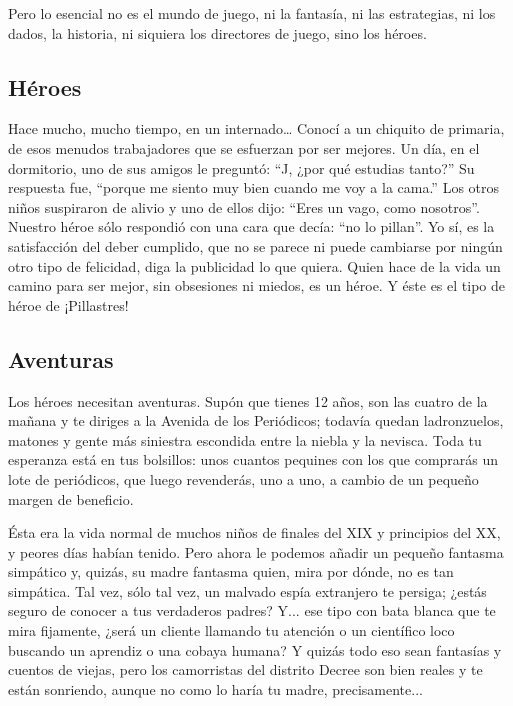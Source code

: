 Pero lo esencial no es el mundo de juego, ni la fantasía, ni las estrategias, ni los dados, la historia, ni siquiera los directores de juego, sino los héroes.

\subsection{Héroes}

Hace mucho, mucho tiempo, en un internado… Conocí a un chiquito de primaria, de esos menudos trabajadores que se esfuerzan por ser mejores. Un día, en el dormitorio, uno de sus amigos le preguntó: “J, ¿por qué estudias tanto?” Su respuesta fue, “porque me siento muy bien cuando me voy a la cama.” Los otros niños suspiraron de alivio y uno de ellos dijo: “Eres un vago, como nosotros”. Nuestro héroe sólo respondió con una cara que decía: “no lo pillan”. Yo sí, es la satisfacción del deber cumplido, que no se parece ni puede cambiarse por ningún otro tipo de felicidad, diga la publicidad lo que quiera. Quien hace de la vida un camino para ser mejor, sin obsesiones ni miedos, es un héroe. Y éste es el tipo de héroe de ¡Pillastres!

\subsection{Aventuras}

Los héroes necesitan aventuras. Supón que tienes 12 años, son las cuatro de la mañana y te diriges a la Avenida de los Periódicos; todavía quedan ladronzuelos, matones y gente más siniestra escondida entre la niebla y la nevisca. Toda tu esperanza está en tus bolsillos: unos cuantos pequines con los que comprarás un lote de periódicos, que luego revenderás, uno a uno, a cambio de un pequeño margen de beneficio.

Ésta era la vida normal de muchos niños de finales del XIX y principios del XX, y peores días habían tenido. Pero ahora le podemos añadir un pequeño fantasma simpático y, quizás, su madre fantasma quien, mira por dónde, no es tan simpática. Tal vez, sólo tal vez, un malvado espía extranjero te persiga; ¿estás seguro de conocer a tus verdaderos padres? Y... ese tipo con bata blanca que te mira fijamente, ¿será un cliente llamando tu atención o un científico loco buscando un aprendiz o una cobaya humana? Y quizás todo eso sean fantasías y cuentos de viejas, pero los camorristas del distrito Decree son bien reales y te están sonriendo, aunque no como lo haría tu madre, precisamente...

